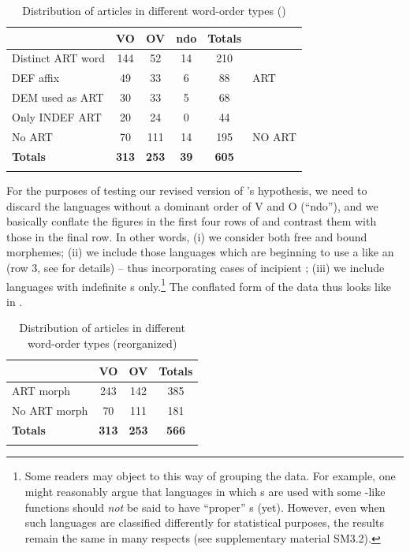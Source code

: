 \documentclass[output=paper]{langsci/langscibook}
\begin{document}
\begin{table}
\begin{tabularx}{.8\textwidth}{lSSSSl}
\lsptoprule
& VO &  OV &  ndo &  Totals\\
\midrule
Distinct ART word & 144 & 52 & 14 & 210 & \\
DEF affix & 49 & 33 & 6 & 88 & ART\\
DEM used as ART & 30 & 33 & 5 & 68 & \\
Only INDEF ART & 20 & 24 & 0 & 44 & \\
\midrule
No ART & 70 & 111 & 14 & 195 & NO ART\\
\midrule
\textbf{Totals} & \textbf{313} & \textbf{253} & \textbf{39} & \textbf{605} & \\
\lspbottomrule
\end{tabularx}
\caption{Distribution of articles in different word-order types (\citealt{Dryer2013_Def,Dryer2013_OV})}
\label{tab:ksb:1}
\end{table} 

For the purposes of testing our revised version of ’s hypothesis, we need to discard the languages without a dominant order of V and O (“ndo”), and we basically conflate the figures in the first four rows of  and contrast them with those in the final row. In other words, (i) we consider both free and bound  morphemes; (ii) we include those languages which are beginning to use a  like an  (row 3, see \citealt{Dryer2013_Def} for details) – thus incorporating cases of incipient ; (iii) we include languages with indefinite s only.\footnote{Some readers may object to this way of grouping the data. For example, one might reasonably argue that languages in which s are used with some -like functions should \textit{not} be said to have “proper” s (yet). However, even when such languages are classified differently for statistical purposes, the results remain the same in many respects (see supplementary material SM3.2).} The conflated form of the data thus looks like in .

\begin{table} 

\begin{tabularx}{.8\textwidth}{lSSS}
\lsptoprule
& VO  & OV & Totals\\
\midrule
ART morph & 243 & 142 & 385\\
No ART morph & 70 & 111 & 181\\
\midrule 
\textbf{Totals} & \textbf{313} & \textbf{253} & \textbf{566}\\
\lspbottomrule
\end{tabularx} 
\caption{Distribution of articles in different word-order types (reorganized)}
\label{tab:ksb:2}
\end{table} 
\end{document}

